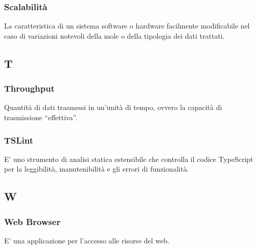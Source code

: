 	\subsubsection{Scalabilità}
	La caratteristica di un sistema software o hardware facilmente modificabile nel caso di variazioni
	notevoli della mole o della tipologia dei dati trattati.
	
	\subsection{T}
	\subsubsection{Throughput}
			Quantità di dati trasmessi in un’unità di tempo, ovvero la capacità di trasmissione “effettiva”.
			
	\subsubsection{TSLint}
	E' uno strumento di analisi statica estensibile che controlla il codice TypeScript per la leggibilità, manutenibilità e gli errori di funzionalità.
	
	\subsection{W}
	\subsubsection{Web Browser}
	E' una applicazione per l'accesso alle risorse del web.

	
	
	